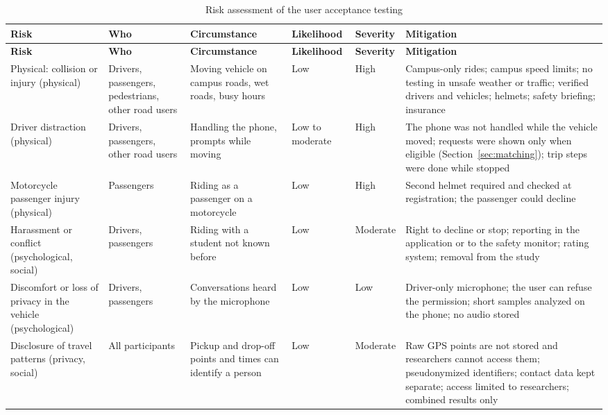 \begin{footnotesize}
\begin{longtable}{p{}p{}p{}p{}p{}p{}}
\caption[Risk assessment of the user acceptance testing]{Risk assessment of the user acceptance testing}\label{tab:risk}\\
\hline
\textbf{Risk} & \textbf{Who} & \textbf{Circumstance} & \textbf{Likelihood} & \textbf{Severity} & \textbf{Mitigation} \\ \hline
\endfirsthead
\hline
\textbf{Risk} & \textbf{Who} & \textbf{Circumstance} & \textbf{Likelihood} & \textbf{Severity} & \textbf{Mitigation} \\ \hline
\endhead
Physical: collision or injury (physical) & Drivers, passengers, pedestrians, other road users & Moving vehicle on campus roads, wet roads, busy hours & Low & High & Campus-only rides; campus speed limits; no testing in unsafe weather or traffic; verified drivers and vehicles; helmets; safety briefing; insurance \\ \hline
Driver distraction (physical) & Drivers, passengers, other road users & Handling the phone, prompts while moving & Low to moderate & High & The phone was not handled while the vehicle moved; requests were shown only when eligible (Section~\ref{sec:matching}); trip steps were done while stopped \\ \hline
Motorcycle passenger injury (physical) & Passengers & Riding as a passenger on a motorcycle & Low & High & Second helmet required and checked at registration; the passenger could decline \\ \hline
Harassment or conflict (psychological, social) & Drivers, passengers & Riding with a student not known before & Low & Moderate & Right to decline or stop; reporting in the application or to the safety monitor; rating system; removal from the study \\ \hline
Discomfort or loss of privacy in the vehicle (psychological) & Drivers, passengers & Conversations heard by the microphone & Low & Low & Driver-only microphone; the user can refuse the permission; short samples analyzed on the phone; no audio stored \\ \hline
Disclosure of travel patterns (privacy, social) & All participants & Pickup and drop-off points and times can identify a person & Low & Moderate & Raw GPS points are not stored and researchers cannot access them; pseudonymized identifiers; contact data kept separate; access limited to researchers; combined results only \\ \hline

\end{longtable}
\end{footnotesize}
